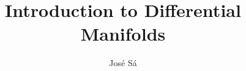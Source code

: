 \documentclass[11pt,a4paper]{article}
\title{Introduction to Differential Manifolds}
\author{José Sá}
\affiliation{Wolfson College, University of Cambridge, UK}
\begin{document}
\maketitle
\clearpage







\nocite{*}


\end{document}
